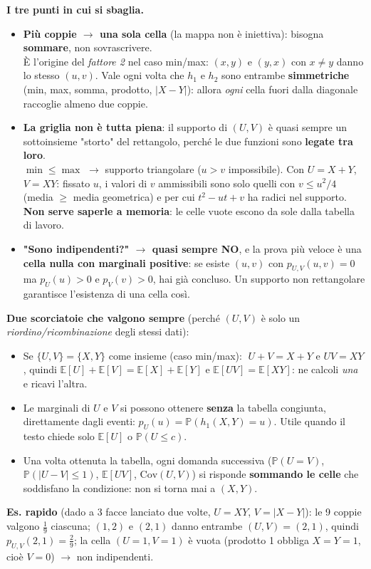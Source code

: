 \documentclass[12pt]{extarticle} %
\begin{document}
\textbf{I tre punti in cui si sbaglia.}
\begin{itemize}
    \item \textbf{Più coppie $\to$ una sola cella} (la mappa non è iniettiva): bisogna \textbf{sommare}, non sovrascrivere. \\ {\footnotesize È l'origine del \emph{fattore 2} nel caso min/max: $(x,y)$ e $(y,x)$ con $x \ne y$ danno lo stesso $(u,v)$. Vale ogni volta che $h_1$ e $h_2$ sono entrambe \textbf{simmetriche} (min, max, somma, prodotto, $|X-Y|$): allora \emph{ogni} cella fuori dalla diagonale raccoglie almeno due coppie.}
    \item \textbf{La griglia non è tutta piena}: il supporto di $(U,V)$ è quasi sempre un sottoinsieme "storto" del rettangolo, perché le due funzioni sono \textbf{legate tra loro}. \\ {\footnotesize $\min \le \max$ $\to$ supporto triangolare ($u > v$ impossibile). Con $U=X+Y$, $V=XY$: fissato $u$, i valori di $v$ ammissibili sono solo quelli con $v \le u^2/4$ (media $\ge$ media geometrica) e per cui $t^2 - ut + v$ ha radici nel supporto. \textbf{Non serve saperle a memoria}: le celle vuote escono da sole dalla tabella di lavoro.}
    \item \textbf{"Sono indipendenti?" $\to$ quasi sempre NO}, e la prova più veloce è una \textbf{cella nulla con marginali positive}: se esiste $(u,v)$ con $p_{U,V}(u,v)=0$ ma $p_U(u)>0$ e $p_V(v)>0$, hai già concluso. {\footnotesize Un supporto non rettangolare garantisce l'esistenza di una cella così.}
\end{itemize}

\textbf{Due scorciatoie che valgono sempre} (perché $(U,V)$ è solo un \emph{riordino/ricombinazione} degli stessi dati):
\begin{itemize}
    \item Se $\{U,V\} = \{X,Y\}$ come insieme (caso min/max): $\;U+V = X+Y$ e $UV = XY$, quindi $\mathbb{E}[U]+\mathbb{E}[V] = \mathbb{E}[X]+\mathbb{E}[Y]$ e $\mathbb{E}[UV] = \mathbb{E}[XY]$: ne calcoli \emph{una} e ricavi l'altra.
    \item Le marginali di $U$ e $V$ si possono ottenere \textbf{senza} la tabella congiunta, direttamente dagli eventi: $p_U(u) = \mathbb{P}(h_1(X,Y) = u)$. {\footnotesize Utile quando il testo chiede solo $\mathbb{E}[U]$ o $\mathbb{P}(U \le c)$.}
    \item Una volta ottenuta la tabella, ogni domanda successiva ($\mathbb{P}(U=V)$, $\mathbb{P}(|U-V|\le 1)$, $\mathbb{E}[UV]$, $\mathrm{Cov}(U,V)$) si risponde \textbf{sommando le celle} che soddisfano la condizione: non si torna mai a $(X,Y)$.
\end{itemize}
{\footnotesize \textbf{Es. rapido} (dado a 3 facce lanciato due volte, $U = XY$, $V = |X-Y|$): le 9 coppie valgono $\frac19$ ciascuna; $(1,2)$ e $(2,1)$ danno entrambe $(U,V)=(2,1)$, quindi $p_{U,V}(2,1) = \frac29$; la cella $(U{=}1,V{=}1)$ è vuota (prodotto 1 obbliga $X=Y=1$, cioè $V=0$) $\to$ non indipendenti.}
\end{document}
